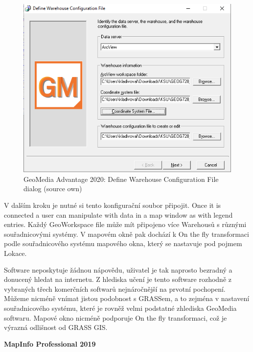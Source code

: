 \documentclass[a4paper,10pt,twoside]{article}
\begin{document}
\vspace{0.3cm}
\begin{figure}[hbt!] 
\begin{center}
\includegraphics[width=12cm]{../pictures/define_config_geomedia.png} 
\caption[GeoMedia Advantage 2020: Define Warehouse Configuration File dialog (source own)]{GeoMedia Advantage 2020: Define Warehouse Configuration File dialog (source own)}
\label{fig:define_config_geomedia}
\end{center}
\end{figure}

\noindent V dalším kroku je nutné si tento konfigurační soubor připojit. Once it is connected a user can manipulate with data in a map window as with legend entries. Každý GeoWorkspace file může mít připojeno více Warehousů s různými souřadnicovými systémy. V mapovém okně pak dochází k On the fly transformaci podle souřadnicového systému mapového okna, který se nastavuje pod pojmem Lokace. 

Software neposkytuje žádnou nápovědu, uživatel je tak naprosto bezradný a donucený hledat na internetu. Z hlediska učení je tento software rozhodně z vybraných třech komerčních softwarů nejnáročnější na prvotní pochopení. Můžeme nicméně vnímat jistou podobnost s GRASSem, a to zejména v nastavení souřadnicového systému, které je rovněž velmi podstatné zhlediska GeoMedia softwaru.  Mapové okno nicméně podporuje On the fly transformaci, což je výrazná odlišnost od GRASS GIS.

\newpage
\vspace*{-1cm}
\bigskip

\noindent \textbf {MapInfo Professional 2019}
\end{document}
